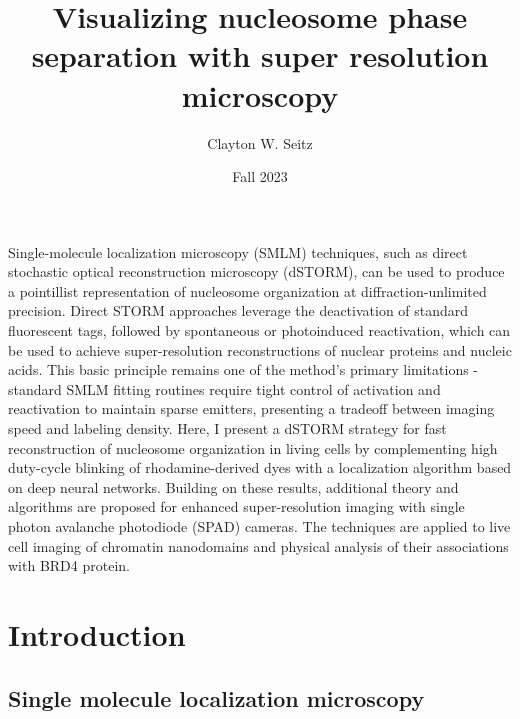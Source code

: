 \documentclass{ucetd}
\title{Visualizing nucleosome phase separation with super resolution microscopy}
\author{Clayton W. Seitz}
\date{Fall 2023}
\begin{document}
\maketitle



\tableofcontents


\abstract

Single-molecule localization microscopy (SMLM) techniques, such as direct stochastic optical reconstruction microscopy (dSTORM), can be used to produce a pointillist representation of nucleosome organization at diffraction-unlimited precision. Direct STORM approaches leverage the deactivation of standard fluorescent tags, followed by spontaneous or photoinduced reactivation, which can be used to achieve super-resolution reconstructions of nuclear proteins and nucleic acids. This basic principle remains one of the method's primary limitations - standard SMLM fitting routines require tight control of activation and reactivation to maintain sparse emitters, presenting a tradeoff between imaging speed and labeling density. Here, I present a dSTORM strategy for fast reconstruction of nucleosome organization in living cells by complementing high duty-cycle blinking of rhodamine-derived dyes with a localization algorithm based on deep neural networks. Building on these results, additional theory and algorithms are proposed for enhanced super-resolution imaging with single photon avalanche photodiode (SPAD) cameras. The techniques are applied to live cell imaging of chromatin nanodomains and physical analysis of their associations with BRD4 protein. 


\clearpage

\mainmatter



\section{Introduction}

\subsection{Single molecule localization microscopy}
\end{document}
